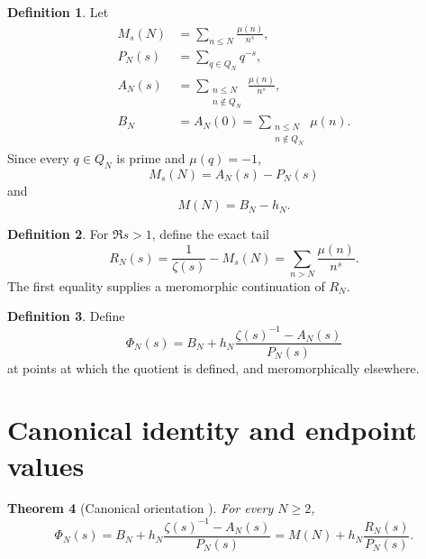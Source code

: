 \documentclass[11pt]{amsart}
\numberwithin{equation}{section}
\theoremstyle{plain}
\newtheorem{theorem}{Theorem}[section]
\theoremstyle{definition}
\newtheorem{definition}[theorem]{Definition}
\theoremstyle{remark}
\newcommand{\1}{\mathbf{1}}
\begin{document}
\begin{definition}
\label{def:mobius_polynomials}
Let
\begin{align}
M_s(N)
&=
\sum_{n\leq N}\frac{\mu(n)}{n^s},
\label{eq:MsN_definition}
\\
P_N(s)
&=
\sum_{q\in Q_N}q^{-s},
\label{eq:PN_definition}
\\
A_N(s)
&=
\sum_{\substack{n\leq N\\n\notin Q_N}}
\frac{\mu(n)}{n^s},
\label{eq:AN_definition}
\\
B_N
&=
A_N(0)
=
\sum_{\substack{n\leq N\\n\notin Q_N}}\mu(n).
\label{eq:BN_definition}
\end{align}
Since every \(q\in Q_N\) is prime and \(\mu(q)=-1\),
\begin{equation}
M_s(N)=A_N(s)-P_N(s)
\label{eq:Ms_A_minus_P}
\end{equation}
and
\begin{equation}
M(N)=B_N-h_N.
\label{eq:M_B_minus_h}
\end{equation}
\end{definition}

\begin{definition}
\label{def:tail_RN}
For \(\Re s>1\), define the exact tail
\begin{equation}
R_N(s)
=
\frac{1}{\zeta(s)}-M_s(N)
=
\sum_{n>N}\frac{\mu(n)}{n^s}.
\label{eq:RN_definition}
\end{equation}
The first equality supplies a meromorphic continuation of \(R_N\).
\end{definition}

\begin{definition}
\label{def:PhiN}
Define
\begin{equation}
\Phi_N(s)
=
B_N+
h_N\frac{\zeta(s)^{-1}-A_N(s)}{P_N(s)}
\label{eq:PhiN_definition}
\end{equation}
at points at which the quotient is defined, and meromorphically elsewhere.
\end{definition}

\section{Canonical identity and endpoint values}
\label{sec:canonical_identity}


\begin{theorem}[Canonical orientation {}]
\label{thm:canonical_orientation}
For every \(N\geq2\),
\begin{equation}
\boxed{
\Phi_N(s)
=
B_N+
h_N\frac{\zeta(s)^{-1}-A_N(s)}{P_N(s)}
=
M(N)+h_N\frac{R_N(s)}{P_N(s)}.
}
\label{eq:canonical_orientation}
\end{equation}
\end{theorem}
\end{document}
